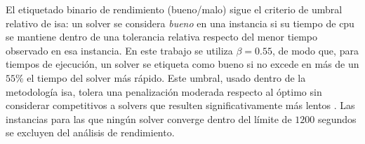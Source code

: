 El etiquetado binario de rendimiento (bueno/malo) sigue el criterio de umbral relativo de \acrshort{isa}:
un solver se considera \textit{bueno} en una instancia si su tiempo de \acrshort{cpu} se mantiene dentro de una tolerancia relativa respecto del
menor tiempo observado en esa instancia. En este trabajo se utiliza $\beta=0.55$, de modo que, para tiempos de ejecución, un solver se etiqueta
como bueno si no excede en más de un $55\%$ el tiempo del solver más rápido. Este umbral, usado dentro de la metodología \acrshort{isa}, tolera
una penalización moderada respecto al óptimo sin considerar competitivos a solvers que resulten significativamente más lentos
\cite{munozAndremunInstanceSpaceFebruary2023a}. Las instancias para las que ningún solver converge dentro del límite de $1200$ segundos se excluyen
del análisis de rendimiento.
